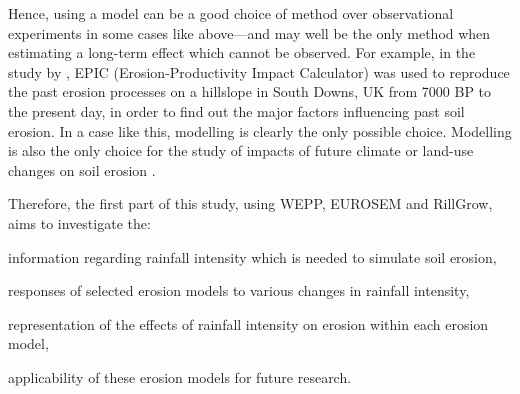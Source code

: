 Hence, using a model can be a good choice of method over observational
experiments in some cases like above---and may well be the only method when
estimating a long-term effect which cannot be observed. For example, in the
study by \citet{favis-mortlock1997-79}, EPIC (Erosion-Productivity Impact
Calculator) was used to reproduce the past erosion processes on a hillslope in
South Downs, UK from 7000 BP to the present day, in order to find out the major
factors influencing past soil erosion. In a case like this, modelling is clearly
the only possible choice. Modelling is also the only choice for the study of
impacts of future climate or land-use changes on soil erosion
\citep{favis-mortlock1995-365,favis-mortlock1999-329,pruski2002-7,
pruski2002-climate,nearing2005-131}.

Therefore, the first part of this study, using WEPP, EUROSEM and RillGrow, aims
to investigate the:
\begin{itemize*}
  \item information regarding rainfall intensity which is needed to simulate
soil erosion,
  \item responses of selected erosion models to various changes in rainfall
intensity,
  \item representation of the effects of rainfall intensity on erosion
within each erosion model,
  \item applicability of these erosion models for future research.
\end{itemize*}

%

